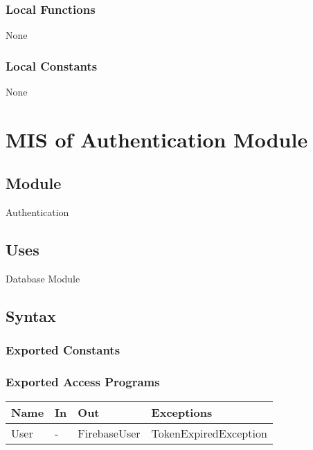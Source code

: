 \documentclass[12pt, titlepage]{article}
\begin{document}
\subsubsection{Local Functions}

None

\subsubsection{Local Constants}

None

\newpage

\section{MIS of Authentication Module} \label{mAuth}

\subsection{Module}

Authentication

\subsection{Uses}

Database Module

\subsection{Syntax}

\subsubsection{Exported Constants}

\subsubsection{Exported Access Programs}

\begin{center}
	\begin{tabular}{p{4cm} p{2cm} p{4cm} p{4cm}}
	\hline
	\textbf{Name} & \textbf{In} & \textbf{Out} & \textbf{Exceptions} \\
	\hline
	User & - & FirebaseUser & TokenExpiredException \\
	\hline
	\end{tabular}
\end{center}
\end{document}
